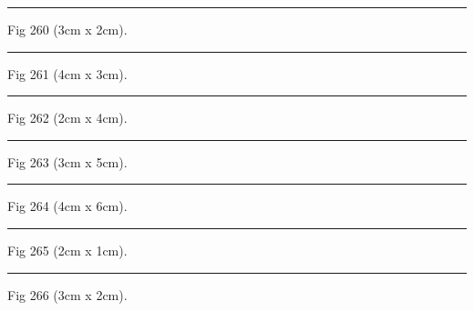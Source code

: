 \documentclass[a4paper,11pt]{article}
\begin{document}
\begin{swarmwrap}%
  \begin{minipage}[t]{3cm}
    \centering
    \rule{\linewidth}{2cm}
    {\footnotesize Fig 260 (3cm x 2cm).}
  \end{minipage}%
\end{swarmwrap}%
\swarmwrapnext
\lipsum[110]%

\begin{swarmwrap}%
  \begin{minipage}[t]{4cm}
    \centering
    \rule{\linewidth}{3cm}
    {\footnotesize Fig 261 (4cm x 3cm).}
  \end{minipage}%
\end{swarmwrap}%
\swarmwrapnext
\lipsum[111]%

\begin{swarmwrap}%
  \begin{minipage}[t]{2cm}
    \centering
    \rule{\linewidth}{4cm}
    {\footnotesize Fig 262 (2cm x 4cm).}
  \end{minipage}%
\end{swarmwrap}%
\swarmwrapnext
\lipsum[112]%

\begin{swarmwrap}%
  \begin{minipage}[t]{3cm}
    \centering
    \rule{\linewidth}{5cm}
    {\footnotesize Fig 263 (3cm x 5cm).}
  \end{minipage}%
\end{swarmwrap}%
\swarmwrapnext
\lipsum[113]%

\begin{swarmwrap}%
  \begin{minipage}[t]{4cm}
    \centering
    \rule{\linewidth}{6cm}
    {\footnotesize Fig 264 (4cm x 6cm).}
  \end{minipage}%
\end{swarmwrap}%
\swarmwrapnext
\lipsum[114]%

\begin{swarmwrap}%
  \begin{minipage}[t]{2cm}
    \centering
    \rule{\linewidth}{1cm}
    {\footnotesize Fig 265 (2cm x 1cm).}
  \end{minipage}%
\end{swarmwrap}%
\swarmwrapnext
\lipsum[115]%

\begin{swarmwrap}%
  \begin{minipage}[t]{3cm}
    \centering
    \rule{\linewidth}{2cm}
    {\footnotesize Fig 266 (3cm x 2cm).}
  \end{minipage}%
\end{swarmwrap}%
\swarmwrapnext
\lipsum[116]%
\end{document}
